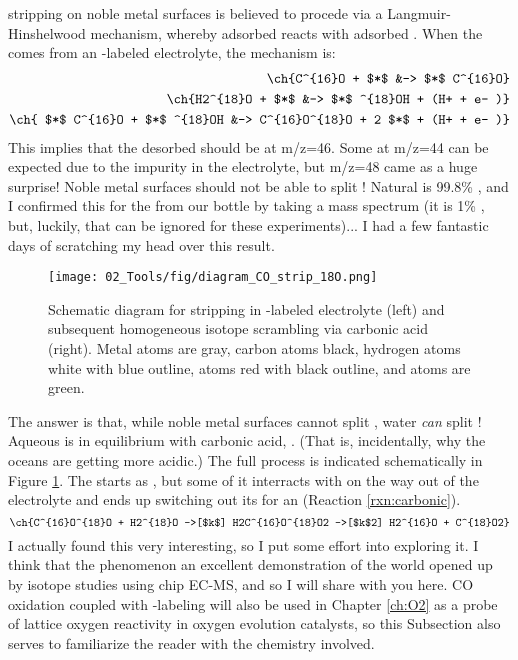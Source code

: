  stripping on noble metal surfaces is believed to procede via a Langmuir-Hinshelwood mechanism\cite{Mayrhofer2005, Koper2009}, whereby adsorbed  reacts with adsorbed . When the  comes from an -labeled electrolyte, the mechanism is:
\begin{align}
\ch{C^{16}O + $*$ &-> $*$ C^{16}O}\\
\ch{H2^{18}O + $*$ &-> $*$ ^{18}OH + (H+ + e- )}\\
\ch{ $*$ C^{16}O +  $*$ ^{18}OH &-> C^{16}O^{18}O + 2 $*$ + (H+ + e- )}
\end{align}
This implies that the  desorbed should be  at m/z=46. Some  at m/z=44 can be expected due to the  impurity in the electrolyte, but m/z=48 came as a huge surprise! Noble metal surfaces should not be able to split \cite{Bernasek1975}!  Natural  is 99.8\% , and I confirmed this for the  from our bottle by taking a mass spectrum (it is 1\% , but, luckily, that can be ignored for these experiments)... I had a few fantastic days of scratching my head over this result.
\begin{figure}[b!]
	\centering
	\texttt{[image: 02\_Tools/fig/diagram\_CO\_strip\_18O.png]}
	\caption{Schematic diagram for  stripping in -labeled electrolyte (left) and subsequent homogeneous isotope scrambling via carbonic acid (right). Metal atoms are gray, carbon atoms black, hydrogen atoms white with blue outline,  atoms red with black outline, and  atoms are green.}
	\label{fig:diagram_CO_18O}
\end{figure}
The answer is that, while noble metal surfaces cannot split , water \textit{can} split ! Aqueous  is in equilibrium with carbonic acid, . (That is, incidentally, why the oceans are getting more acidic.) The full process is indicated schematically in Figure \ref{fig:diagram_CO_18O}. The  starts as , but some of it interracts with  on the way out of the electrolyte and ends up switching out its  for an  (Reaction \ref{rxn:carbonic}).
\begin{equation}
\ch{C^{16}O^{18}O + H2^{18}O ->[$k$] H2C^{16}O^{18}O2 ->[$k$2] H2^{16}O + C^{18}O2}\label{rxn:carbonic}
\end{equation}
I actually found this very interesting, so I put some effort into exploring it. I think that the phenomenon an excellent demonstration of the world opened up by isotope studies using chip EC-MS, and so I will share with you here. CO oxidation coupled with -labeling will also be used in Chapter \ref{ch:O2} as a probe of lattice oxygen reactivity in oxygen evolution catalysts, so this Subsection also serves to familiarize the reader with the chemistry involved.

